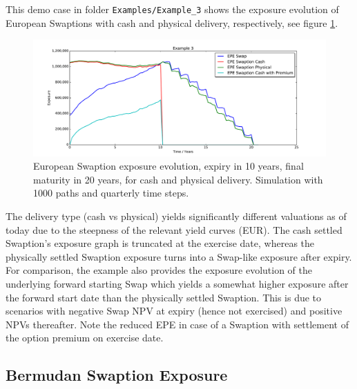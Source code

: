 \documentclass[12pt, a4paper]{article}
\begin{document}
{This demo case in folder {\tt Examples/Example\_3} shows the exposure evolution of European Swaptions with cash and
physical delivery, respectively, see figure \ref{fig_3}.
\begin{figure}[h!]
\begin{center}
\includegraphics[scale=0.45]{mpl_swaption.pdf}
\end{center}
\caption{European Swaption exposure evolution, expiry in 10 years, final maturity in 20 years, for cash and physical
  delivery. Simulation with 1000 paths and quarterly time steps. }
\label{fig_3}
\end{figure}
The delivery type (cash vs physical) yields significantly different valuations as of today due to the steepness of the
relevant yield curves (EUR). The cash settled Swaption's exposure graph is truncated at the exercise date, whereas the
physically settled Swaption exposure turns into a Swap-like exposure after expiry. For comparison, the example also
provides the exposure evolution of the underlying forward starting Swap which yields a somewhat higher exposure after
the forward start date than the physically settled Swaption. This is due to scenarios with negative Swap NPV at expiry
(hence not exercised) and positive NPVs thereafter. Note the reduced EPE in case of a Swaption with settlement of the option premium on exercise date.

\subsection{Bermudan Swaption Exposure}

}
\end{document}
